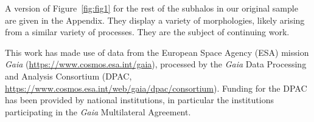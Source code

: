 \documentclass[linenumbers, twocolumn]{aastex631}
\begin{document}
A version of Figure~\ref{fig:fig1} for the rest of the subhalos in our original sample are given in the Appendix. They display a variety of morphologies, likely arising from a similar variety of processes. They are the subject of continuing work.



\begin{acknowledgements}
This work has made use of data from the European Space Agency (ESA) mission {\it Gaia} (\url{https://www.cosmos.esa.int/gaia}), processed by the {\it Gaia} Data Processing and Analysis Consortium (DPAC, \url{https://www.cosmos.esa.int/web/gaia/dpac/consortium}). Funding for the DPAC has been provided by national institutions, in particular the institutions participating in the {\it Gaia} Multilateral Agreement.
\end{acknowledgements}

{}


% 
\end{document}
